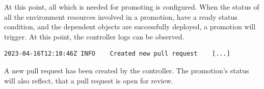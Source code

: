 At this point, all which is needed for promoting is configured.
When the status of all the environment resources involved in a promotion,
have a ready status condition,
and the dependent objects are successfully deployed,
a promotion will trigger.
%
At this point, the controller logs can be observed.

\begin{lstlisting}
2023-04-16T12:10:46Z INFO    Created new pull request    [...]
\end{lstlisting}

A new pull request
has been created by the controller.
The promotion's status will also reflect, that
a pull request is open for review.



